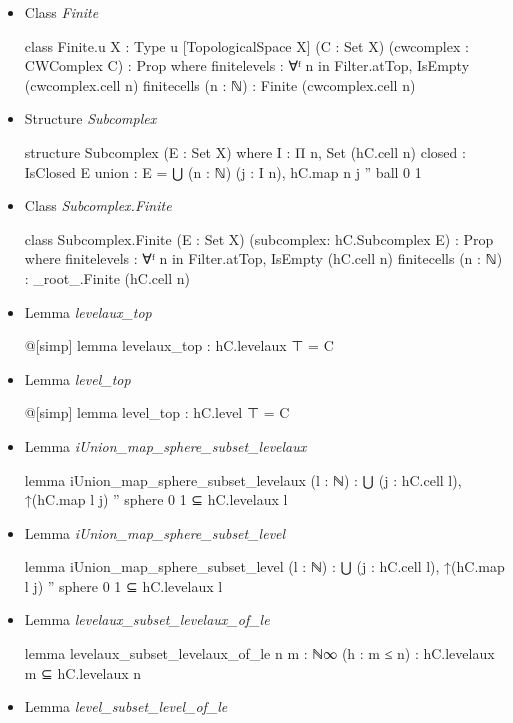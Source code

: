 \documentclass[colorinlistoftodos]{article}
\begin{document}
\begin{itemize}
  \item Class \emph{Finite}
\begin{leancode}
class Finite.{u} {X : Type u} [TopologicalSpace X] (C : Set X) (cwcomplex : CWComplex C) :
Prop where
  finitelevels : ∀ᶠ n in Filter.atTop, IsEmpty (cwcomplex.cell n)
  finitecells (n : ℕ) : Finite (cwcomplex.cell n)
\end{leancode}
  \item Structure \emph{Subcomplex}
\begin{leancode}
structure Subcomplex (E : Set X) where
  I : Π n, Set (hC.cell n)
  closed : IsClosed E
  union : E = ⋃ (n : ℕ) (j : I n), hC.map n j '' ball 0 1
\end{leancode}
  \item Class \emph{Subcomplex.Finite}
\begin{leancode}
class Subcomplex.Finite (E : Set X) (subcomplex: hC.Subcomplex E) : Prop where
  finitelevels : ∀ᶠ n in Filter.atTop, IsEmpty (hC.cell n)
  finitecells (n : ℕ) : _root_.Finite (hC.cell n)
\end{leancode}
  \item Lemma \emph{levelaux\_top}
\begin{leancode}
@[simp] lemma levelaux_top : hC.levelaux ⊤ = C
\end{leancode}
  \item Lemma \emph{level\_top}
\begin{leancode}
@[simp] lemma level_top : hC.level ⊤ = C
\end{leancode}
  \item Lemma \emph{iUnion\_map\_sphere\_subset\_levelaux}
\begin{leancode}
lemma iUnion_map_sphere_subset_levelaux (l : ℕ) : 
  ⋃ (j : hC.cell l), ↑(hC.map l j) '' sphere 0 1 ⊆ hC.levelaux l
\end{leancode}
  \item Lemma \emph{iUnion\_map\_sphere\_subset\_level}
\begin{leancode}
lemma iUnion_map_sphere_subset_level (l : ℕ) :
  ⋃ (j : hC.cell l), ↑(hC.map l j) '' sphere 0 1 ⊆ hC.levelaux l
\end{leancode}
  \item Lemma \emph{levelaux\_subset\_levelaux\_of\_le}
\begin{leancode}
lemma levelaux_subset_levelaux_of_le {n m : ℕ∞} (h : m ≤ n) :
  hC.levelaux m ⊆ hC.levelaux n
\end{leancode}
  \item Lemma \emph{level\_subset\_level\_of\_le}

\end{itemize}
\end{document}
